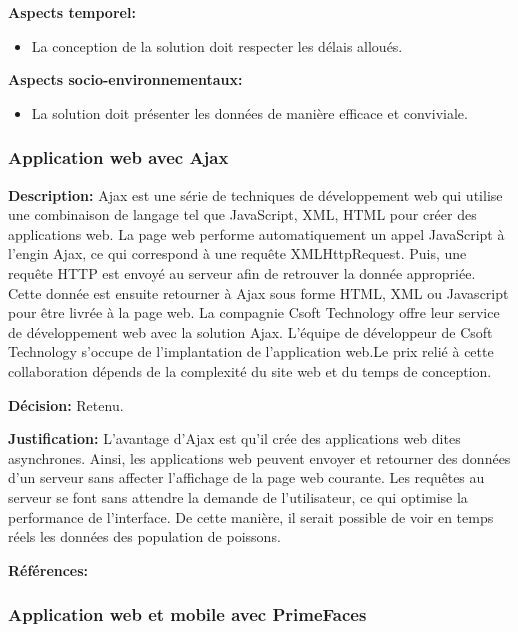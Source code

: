 \textbf{Aspects temporel:}
\begin{itemize} [label = {--}]
    \item La conception de la solution doit respecter les délais alloués.
\end{itemize}

\textbf{Aspects socio-environnementaux:}
\begin{itemize} [label = {--}]
    \item La solution doit présenter les données de manière efficace et conviviale.
\end{itemize}


\subsubsection{Application web avec Ajax}

\textbf{Description:} Ajax est une série de techniques de développement web qui utilise une combinaison de langage tel que JavaScript, XML, HTML pour créer des applications web. La page web performe automatiquement un appel JavaScript à l'engin Ajax, ce qui correspond à une requête XMLHttpRequest. Puis, une requête HTTP est envoyé au serveur afin de retrouver la donnée appropriée. Cette donnée est ensuite retourner à Ajax sous forme HTML, XML ou Javascript pour être livrée à la page web. La compagnie Csoft Technology offre leur service de développement web avec la solution Ajax. L'équipe de développeur de Csoft Technology s'occupe de l'implantation de l'application web.Le prix relié à cette collaboration dépends de la complexité du site web et du temps de conception.

\textbf{Décision:} Retenu.

\textbf{Justification:} L'avantage d'Ajax est qu'il crée des applications web dites asynchrones. Ainsi, les applications web peuvent envoyer et retourner des données d'un serveur sans affecter l'affichage de la page web courante. Les requêtes au serveur se font sans attendre la demande de l'utilisateur, ce qui optimise la performance de l'interface. De cette manière, il serait possible de voir en temps réels les données des population de poissons.

\textbf{Références:} \cite{Ajax_wiki} \cite{Ajax} \cite{Csoft}

\subsubsection{Application web et mobile avec PrimeFaces}

